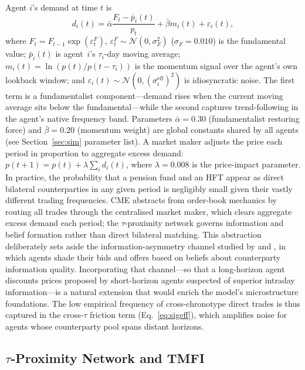 \documentclass[preprint,12pt,authoryear]{elsarticle}
\begin{document}
Agent $i$'s demand at time $t$ is
\begin{equation}
  d_i(t) = \bar{\alpha} \frac{F_t - \bar{p}_i(t)}{p_t}
          + \bar{\beta} m_i(t) + \varepsilon_i(t),
  \label{eq:demand}
\end{equation}
where $F_t = F_{t-1}\exp(\varepsilon_t^F)$, $\varepsilon_t^F \sim
\mathcal{N}(0,\sigma_F^2)$ ($\sigma_F = 0.010$) is the fundamental value;
$\bar{p}_i(t)$ is agent~$i$'s $\tau_i$-day moving average;
$m_i(t) = \ln(p(t)/p(t-\tau_i))$ is the momentum signal over
the agent's own lookback window; and
$\varepsilon_i(t) \sim \mathcal{N}(0,(\sigma_i^{\mathrm{eff}})^2)$ is
idiosyncratic noise.
The first term is a fundamentalist component---demand rises when the
current moving average sits below the fundamental---while the second
captures trend-following in the agent's native frequency band.
Parameters $\bar{\alpha} = 0.30$ (fundamentalist restoring force) and
$\bar{\beta} = 0.20$ (momentum weight) are global constants shared by all
agents (see Section~\ref{sec:sim} parameter list).
A market maker adjusts the price each period in proportion to aggregate
excess demand: $p(t+1) = p(t) + \lambda \sum_i d_i(t)$,
where $\lambda = 0.008$ is the price-impact parameter.
In practice, the probability that a pension fund and an HFT appear as
direct bilateral counterparties in any given period is negligibly small
given their vastly different trading frequencies.
CME abstracts from order-book mechanics by routing all trades through
the centralised market maker, which clears aggregate excess demand each
period; the $\tau$-proximity network governs information and belief
formation rather than direct bilateral matching.
This abstraction deliberately sets aside the information-asymmetry
channel studied by \citet{kyle1985} and \citet{akerlof1970}, in which
agents shade their bids and offers based on beliefs about counterparty
information quality.
Incorporating that channel---so that a long-horizon agent discounts
prices proposed by short-horizon agents suspected of superior
intraday information---is a natural extension that would enrich the
model's microstructure foundations.
The low empirical frequency of cross-chronotype direct trades is thus
captured in the cross-$\tau$ friction term (Eq.~\eqref{eq:sigeff}),
which amplifies noise for agents whose counterparty pool spans
distant horizons.

\subsection{$\tau$-Proximity Network and TMFI}
\end{document}
